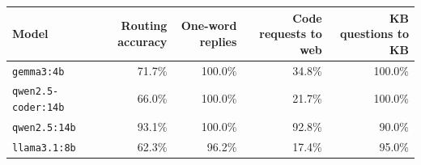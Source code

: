 \begin{tabular}{lrrrr}
\hline
Model & Routing accuracy & One-word replies & Code requests to web & KB questions to KB \\
\hline
\texttt{gemma3:4b} & 71.7\% & 100.0\% & 34.8\% & 100.0\% \\
\texttt{qwen2.5-coder:14b} & 66.0\% & 100.0\% & 21.7\% & 100.0\% \\
\texttt{qwen2.5:14b} & 93.1\% & 100.0\% & 92.8\% & 90.0\% \\
\texttt{llama3.1:8b} & 62.3\% & 96.2\% & 17.4\% & 95.0\% \\
\hline
\end{tabular}
